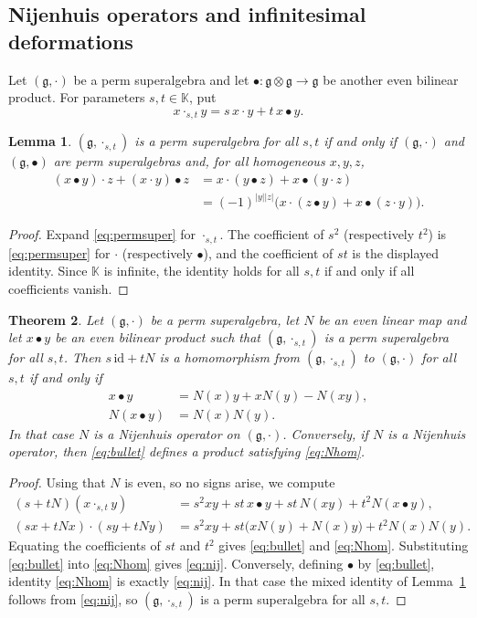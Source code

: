 \documentclass[11pt]{article}
\newtheorem{theorem}{Theorem}[section]
\newtheorem{lemma}[theorem]{Lemma}
\theoremstyle{definition}
\newcommand{\g}{\mathfrak{g}}
\newcommand{\K}{\mathbb{K}}
\newcommand{\id}{\mathrm{id}}
\begin{document}
\subsection{Nijenhuis operators and infinitesimal deformations}\label{sec:deform}

Let $(\g,\cdot)$ be a perm superalgebra and let $\bullet:\g\otimes\g\to\g$ be another even bilinear product. For parameters $s,t\in\K$, put
\[
x\cdot_{s,t}y=s\,x\cdot y+t\,x\bullet y.
\]

\begin{lemma}\label{lem:deform}
$(\g,\cdot_{s,t})$ is a perm superalgebra for all $s,t$ if and only if $(\g,\cdot)$ and $(\g,\bullet)$ are perm superalgebras and, for all homogeneous $x,y,z$,
\[
\begin{aligned}
(x\bullet y)\cdot z+(x\cdot y)\bullet z
&=x\cdot(y\bullet z)+x\bullet(y\cdot z)\\
&=(-1)^{|y||z|}\bigl(x\cdot(z\bullet y)+x\bullet(z\cdot y)\bigr).
\end{aligned}
\]
\end{lemma}
\begin{proof}
Expand \eqref{eq:permsuper} for $\cdot_{s,t}$. The coefficient of $s^2$ (respectively $t^2$) is \eqref{eq:permsuper} for $\cdot$ (respectively $\bullet$), and the coefficient of $st$ is the displayed identity. Since $\K$ is infinite, the identity holds for all $s,t$ if and only if all coefficients vanish.
\end{proof}

\begin{theorem}\label{thm:defhom}
Let $(\g,\cdot)$ be a perm superalgebra, let $N$ be an even linear map and let $x\bullet y$ be an even bilinear product such that $(\g,\cdot_{s,t})$ is a perm superalgebra for all $s,t$. Then $s\,\id+tN$ is a homomorphism from $(\g,\cdot_{s,t})$ to $(\g,\cdot)$ for all $s,t$ if and only if
\begin{align}
x\bullet y&=N(x)y+xN(y)-N(xy),\label{eq:bullet}\\
N(x\bullet y)&=N(x)N(y).\label{eq:Nhom}
\end{align}
In that case $N$ is a Nijenhuis operator on $(\g,\cdot)$. Conversely, if $N$ is a Nijenhuis operator, then \eqref{eq:bullet} defines a product satisfying \eqref{eq:Nhom}.
\end{theorem}
\begin{proof}
Using that $N$ is even, so no signs arise, we compute
\begin{align*}
(s+tN)(x\cdot_{s,t}y)
&=s^2xy+st\,x\bullet y+st\,N(xy)+t^2N(x\bullet y),\\
(sx+tNx)\cdot(sy+tNy)
&=s^2xy+st\bigl(xN(y)+N(x)y\bigr)+t^2N(x)N(y).
\end{align*}
Equating the coefficients of $st$ and $t^2$ gives \eqref{eq:bullet} and \eqref{eq:Nhom}. Substituting \eqref{eq:bullet} into \eqref{eq:Nhom} gives \eqref{eq:nij}. Conversely, defining $\bullet$ by \eqref{eq:bullet}, identity \eqref{eq:Nhom} is exactly \eqref{eq:nij}. In that case the mixed identity of Lemma~\ref{lem:deform} follows from \eqref{eq:nij}, so $(\g,\cdot_{s,t})$ is a perm superalgebra for all $s,t$.
\end{proof}
\end{document}
